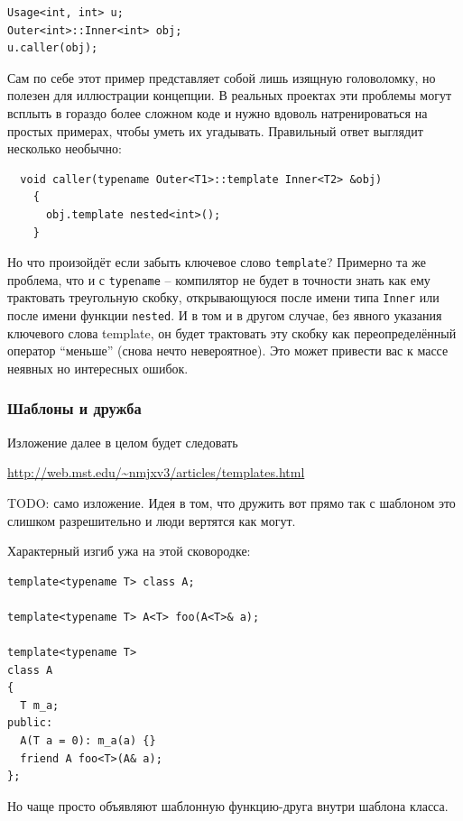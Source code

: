 \documentclass[a4paper,12pt,oneside]{article}
\begin{document}
\begin{lstlisting}
Usage<int, int> u;
Outer<int>::Inner<int> obj;
u.caller(obj);
\end{lstlisting}

Сам по себе этот пример представляет собой лишь изящную головоломку, но полезен для иллюстрации концепции. В реальных проектах эти проблемы могут всплыть в гораздо более сложном коде и нужно вдоволь натренироваться на простых примерах, чтобы уметь их угадывать. Правильный ответ выглядит несколько необычно:

\begin{lstlisting}
  void caller(typename Outer<T1>::template Inner<T2> &obj) 
    { 
      obj.template nested<int>();
    }
\end{lstlisting}

Но что произойдёт если забыть ключевое слово \lstinline!template!? Примерно та же проблема, что и с \lstinline!typename! -- компилятор не будет в точности знать как ему трактовать треугольную скобку, открывающуюся после имени типа \lstinline!Inner! или после имени функции \lstinline!nested!. И в том и в другом случае, без явного указания ключевого слова template, он будет трактовать эту скобку как переопределённый оператор ``меньше'' (снова нечто невероятное). Это может привести вас к массе неявных но интересных ошибок.

\subsubsection{Шаблоны и дружба}\label{BartonNackman}

Изложение далее в целом будет следовать 

\url{http://web.mst.edu/~nmjxv3/articles/templates.html}

TODO: само изложение. Идея в том, что дружить вот прямо так с шаблоном это слишком разрешительно и люди вертятся как могут.

Характерный изгиб ужа на этой сковородке:

\begin{lstlisting}
template<typename T> class A;

template<typename T> A<T> foo(A<T>& a);

template<typename T>
class A
{
  T m_a;
public:
  A(T a = 0): m_a(a) {}
  friend A foo<T>(A& a);
};
\end{lstlisting}

Но чаще просто объявляют шаблонную функцию-друга внутри шаблона класса.
\end{document}
